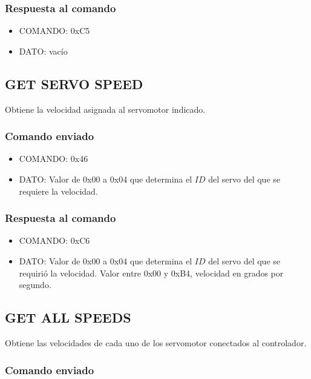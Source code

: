 \documentclass[a4paper,10pt]{article}
\begin{document}
\subsubsection*{Respuesta al comando}

\begin{itemize}
	\item{COMANDO:} 0xC5
	\item{DATO:} vac\'io
\end{itemize}

\subsection{GET SERVO SPEED}
\label{get_servo_speed}

Obtiene la velocidad asignada al servomotor indicado.

\subsubsection*{Comando enviado}

\begin{itemize}
	\item{COMANDO:} 0x46
	\item{DATO:} Valor de 0x00 a 0x04 que determina el $ID$ del servo del que se requiere la velocidad.
\end{itemize}

\subsubsection*{Respuesta al comando}

\begin{itemize}
	\item{COMANDO:} 0xC6
	\item{DATO:} Valor de 0x00 a 0x04 que determina el $ID$ del servo del que se requiri\'o la velocidad.
	Valor entre 0x00 y 0xB4, velocidad en grados por segundo.
\end{itemize}

\subsection{GET ALL SPEEDS}
\label{get_all_speeds}

Obtiene las velocidades de cada uno de los servomotor conectados al controlador.

\subsubsection*{Comando enviado}
\end{document}
